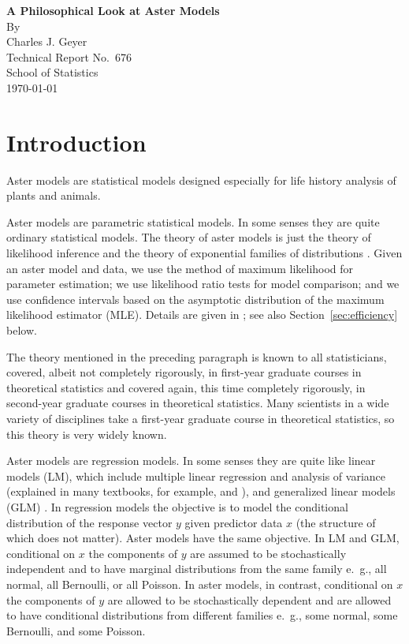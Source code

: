 \documentclass[11pt]{article}
\begin{document}
  \vspace*{0.9375in}
  \begin{center}
    {\bfseries A Philosophical Look at Aster Models} \\
    By \\
    Charles J. Geyer \\
    Technical Report No.~676 \\
    School of Statistics \\
    \today
  \end{center}
  \thispagestyle{empty}
  \cleardoublepage
  \setcounter{page}{1}
  \thispagestyle{empty}

\section{Introduction} \label{sec:intro}

Aster models \citep*{gws,aster2} are statistical models designed especially
for life history analysis of plants and animals.

Aster models are parametric statistical models.  In some senses they are
quite ordinary statistical models.  The theory of aster models is just
the theory of likelihood inference \citep{fisher,severini} and
the theory of exponential families of distributions
\citep{barndorff,brown,thesis}.
Given an aster model and data, we use the method
of maximum likelihood for parameter estimation; we use likelihood ratio
tests for model comparison; and we use confidence intervals based on
the asymptotic distribution of the maximum likelihood estimator (MLE).
Details are given in \citet {gws};
see also Section~\ref{sec:efficiency} below.

The theory mentioned in the preceding paragraph is known to all statisticians,
covered, albeit not completely rigorously, in first-year graduate courses in
theoretical statistics and covered again, this time completely rigorously,
in second-year graduate courses in theoretical statistics.  Many scientists
in a wide variety of disciplines take a first-year graduate course in
theoretical statistics, so this theory is very widely known.

Aster models are regression models.  In some senses they are
quite like linear models (LM), which include multiple linear regression
and analysis of variance (explained in many textbooks, for example,
\citealp{weisberg} and \citealp{oehlert}), and generalized
linear models (GLM) \citep{mccullagh}.  In regression models the objective
is to model the conditional distribution of the response vector $y$ given
predictor data $x$ (the structure of which does not matter).
Aster models have the same objective.  In LM and GLM, conditional on $x$
the components of $y$ are assumed to be stochastically
independent and to have marginal distributions from the same family
e.~g., all normal, all Bernoulli, or all Poisson.
In aster models, in contrast, conditional on $x$
the components of $y$ are allowed to be stochastically dependent and are
allowed to have conditional distributions from different families
e.~g., some normal, some Bernoulli, and some Poisson.
\end{document}
